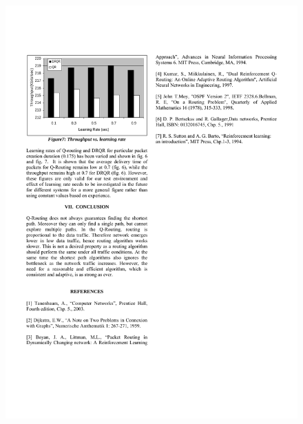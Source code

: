 \documentclass{standalone}
\begin{document}
\begin{figure}[H]
    \centering
    \includegraphics[width=14.5cm]{pic/translate/page-5.pdf}

\end{figure}
\end{document}
